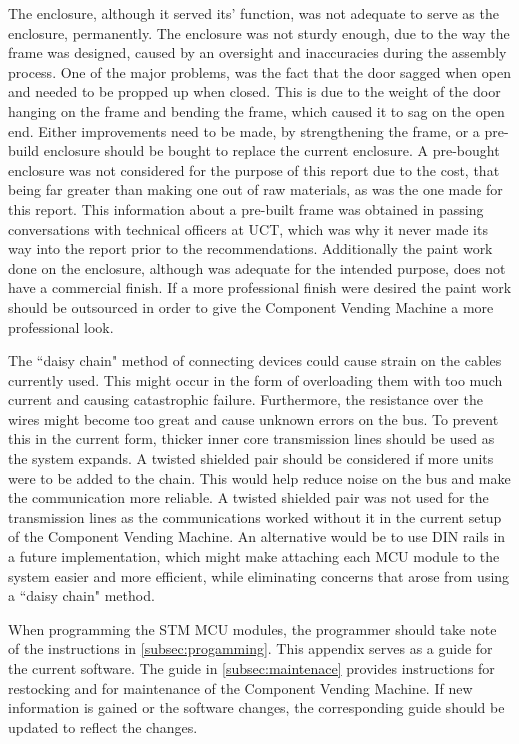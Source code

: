 \documentclass[a4paper,11pt]{article}
\numberwithin{figure}{section}
\numberwithin{table}{section}
\begin{document}
The enclosure, although it served its' function, was not adequate to serve as the enclosure, permanently. The enclosure was not sturdy enough, due to the way the frame was designed, caused by an oversight and inaccuracies during the assembly process. One of the major problems, was the fact that the door sagged when open and needed to be propped up when closed. This is due to the weight of the door hanging on the frame and bending the frame, which caused it to sag on the open end. Either improvements need to be made, by strengthening the frame, or a pre-build enclosure should be bought to replace the current enclosure. A pre-bought enclosure was not considered for the purpose of this report due to the cost, that being far greater than making one out of raw materials, as was the one made for this report. This information about a pre-built frame was obtained in passing conversations with technical officers at UCT, which was why it never made its way into the report prior to the recommendations. Additionally the paint work done on the enclosure, although was adequate for the intended purpose, does not have a commercial finish. If a more professional finish were desired the paint work should be outsourced in order to give the Component Vending Machine a more professional look.

The ``daisy chain" method of connecting devices could cause strain on the cables currently used. This might occur in the form of overloading them with too much current and causing catastrophic failure. Furthermore, the resistance over the wires might become too great and cause unknown errors on the bus. To prevent this in the current form, thicker inner core transmission lines should be used as the system expands. A twisted shielded pair should be considered if more units were to be added to the chain. This would help reduce noise on the bus and make the communication more reliable. A twisted shielded pair was not used for the transmission lines as the communications worked without it in the current setup of the Component Vending Machine. An alternative would be to use DIN rails in a future implementation, which might make attaching each MCU module to the system easier and more efficient, while eliminating concerns that arose from using a ``daisy chain" method.

When programming the STM MCU modules, the programmer should take note of the instructions in \autoref{subsec:progamming}. This appendix serves as a guide for the current software. The guide in \autoref{subsec:maintenace} provides instructions for restocking and for maintenance of the Component Vending Machine. If new information is gained or the software changes, the corresponding guide should be updated to reflect the changes.
\end{document}
